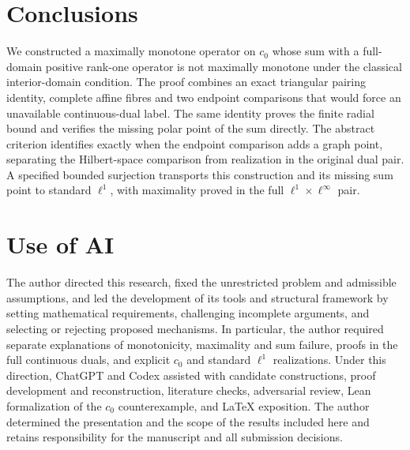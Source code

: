 \section{Conclusions}
\label{sec:conclusion}

We constructed a maximally monotone operator on $c_0$ whose sum with a
full-domain positive rank-one operator is not maximally monotone under
the classical interior-domain condition. The proof combines an exact
triangular pairing identity, complete affine fibres and two endpoint
comparisons that would force an unavailable continuous-dual label.
The same identity proves the finite radial bound and verifies the
missing polar point of the sum directly. The abstract criterion
identifies exactly when the endpoint comparison adds a graph point,
separating the Hilbert-space comparison from realization in the
original dual pair. A specified bounded surjection transports this
construction and its missing sum point to standard $\ell^1$, with
maximality proved in the full $\ell^1\times\ell^\infty$ pair.


\section*{Use of AI}
The author directed this research, fixed the unrestricted problem and
admissible assumptions, and led the development of its tools and structural
framework by setting mathematical requirements, challenging incomplete
arguments, and selecting or rejecting proposed mechanisms. In particular,
the author required separate explanations of monotonicity, maximality and
sum failure, proofs in the full continuous duals, and explicit $c_0$ and
standard $\ell^1$ realizations. Under this direction, ChatGPT and Codex
assisted with candidate constructions, proof development and reconstruction,
literature checks, adversarial review, Lean formalization of the $c_0$
counterexample, and LaTeX exposition. The author determined the presentation
and the scope of the results included here and retains responsibility for
the manuscript and all submission decisions.

